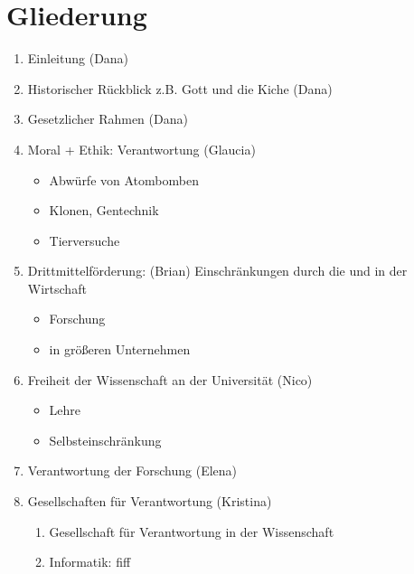 \documentclass[a4paper,10pt]{scrartcl}
\begin{document}
\section*{Gliederung}
\begin{enumerate}
\item Einleitung (Dana)
\item Historischer Rückblick z.B. Gott und die Kiche (Dana)
\item Gesetzlicher Rahmen (Dana)
\item Moral + Ethik: Verantwortung  (Glaucia)
	\begin{itemize}
		\item Abwürfe von Atombomben
		\item Klonen, Gentechnik
		\item Tierversuche
	\end{itemize}
\item Drittmittelförderung: (Brian) Einschränkungen durch die und in der Wirtschaft
	\begin{itemize}
		\item Forschung
		\item in größeren Unternehmen
	\end{itemize}
\item Freiheit der Wissenschaft an der Universität (Nico)
	\begin{itemize}
		\item Lehre
		\item Selbsteinschränkung
	\end{itemize}
\item Verantwortung der Forschung (Elena)
\item Gesellschaften für Verantwortung (Kristina)
	\begin{enumerate}
		\item Gesellschaft für Verantwortung in der Wissenschaft
		\item Informatik: fiff
	\end{enumerate}
\end{enumerate}
\end{document}
